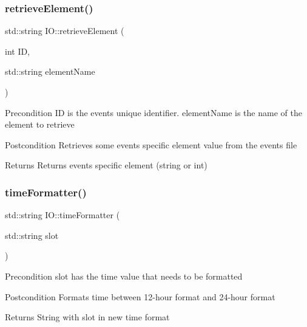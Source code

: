 \subsubsection{\texorpdfstring{retrieve\+Element()}{retrieveElement()}}
{\footnotesize\ttfamily std\+::string I\+O\+::retrieve\+Element (\begin{DoxyParamCaption}\item[{int}]{ID,  }\item[{std\+::string}]{element\+Name }\end{DoxyParamCaption})}

\begin{DoxyPrecond}{Precondition}
ID is the event\textquotesingle{}s unique identifier. element\+Name is the name of the element to retrieve 
\end{DoxyPrecond}
\begin{DoxyPostcond}{Postcondition}
Retrieves some event\textquotesingle{}s specific element value from the events file 
\end{DoxyPostcond}
\begin{DoxyReturn}{Returns}
Returns event\textquotesingle{}s specific element (string or int) 
\end{DoxyReturn}
\mbox{\label{class_i_o_ad78c42847c70915fe94bddd25f716859}} 
\subsubsection{\texorpdfstring{time\+Formatter()}{timeFormatter()}}
{\footnotesize\ttfamily std\+::string I\+O\+::time\+Formatter (\begin{DoxyParamCaption}\item[{std\+::string}]{slot }\end{DoxyParamCaption})}

\begin{DoxyPrecond}{Precondition}
slot has the time value that needs to be formatted 
\end{DoxyPrecond}
\begin{DoxyPostcond}{Postcondition}
Formats time between 12-\/hour format and 24-\/hour format 
\end{DoxyPostcond}
\begin{DoxyReturn}{Returns}
String with slot in new time format 
\end{DoxyReturn}
\mbox{\label{class_i_o_a11fdb7d4afa830fa1441fbf566f73432}} 
